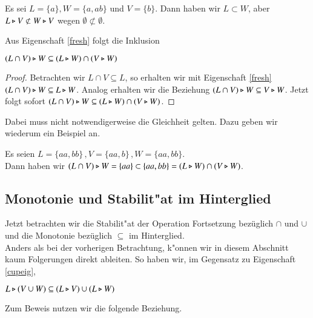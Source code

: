 \vspace{2ex}

\begin{beispiel}
Es sei $L=\{a\}, W=\{a,ab\}$ und $V=\{b\}$. Dann haben wir $L\subset W$, aber $L\triangleright V \not\subset W\triangleright V$ wegen $\emptyset \not\subset\emptyset$.
\end{beispiel}

Aus Eigenschaft \ref{fresh} folgt die Inklusion

\vspace{2ex}

\begin{eigen}
$(L\cap V) \triangleright W \subseteq (L\triangleright W) \cap (V\triangleright W)$
\end{eigen}
\begin{proof}
Betrachten wir $L\cap V \subseteq L$, so erhalten wir mit Eigenschaft \ref{fresh} $(L\cap V) \triangleright W \subseteq L\triangleright W$. Analog erhalten wir die Beziehung 
$(L\cap V) \triangleright W \subseteq V\triangleright W$. Jetzt folgt sofort $(L\cap V)\triangleright W \subseteq (L\triangleright W) \cap (V\triangleright W)$.
\end{proof}
Dabei muss nicht notwendigerweise die Gleichheit gelten. Dazu geben wir wiederum ein Beispiel an.

\vspace{2ex}

\begin{beispiel}
Es seien $L= \{aa,bb\}\, ,V = \{aa,b\}\, ,W = \{aa,bb\}$. \\Dann haben wir $(L\cap V) \triangleright W = \{aa\} \subset \{aa,bb\} = (L\triangleright W) \cap (V\triangleright W)$.
\end{beispiel}

\subsection{Monotonie und Stabilit"at im Hinterglied}
Jetzt betrachten wir die Stabilit"at der Operation Fortsetzung bezüglich $\cap$ und $\cup$ und die Monotonie bezüglich $\subseteq$ im Hinterglied.\\
Anders als bei der vorherigen Betrachtung, k"onnen wir in diesem Abschnitt kaum Folgerungen direkt ableiten.
So haben wir, im Gegensatz zu Eigenschaft \ref{cupeig},

\vspace{2ex}

\begin{eigen}\label{gl22}
$L\triangleright (V\cup W)\subseteq (L\triangleright V) \cup (L\triangleright W)$
\end{eigen}
Zum Beweis nutzen wir die folgende Beziehung.

